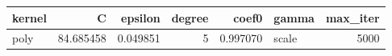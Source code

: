 \begin{tabular}{lrrrrlr}
\toprule
kernel & C & epsilon & degree & coef0 & gamma & max_iter \\
\midrule
poly & 84.685458 & 0.049851 & 5 & 0.997070 & scale & 5000 \\
\bottomrule
\end{tabular}
